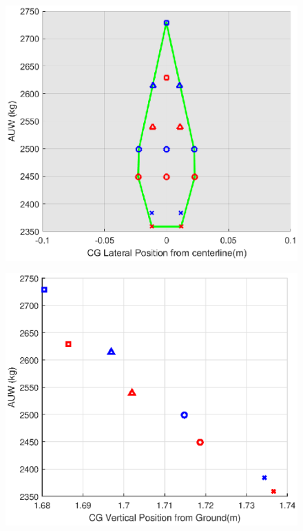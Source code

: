 \documentclass[11pt,a4paper]{article}
\begin{document}
\begin{appendices}
\begin{figure}[H]
\centering
\begin{minipage}{.5\textwidth}
  \centering
  \includegraphics[width=\linewidth]{CGLAT.eps}
  \label{fig:CGlat}
\end{minipage}%
\begin{minipage}{.5\textwidth}
  \centering
  \includegraphics[width=\linewidth]{CGVERT.eps}
  \label{fig:CGvert}
\end{minipage}
\end{figure}




\end{appendices}
\end{document}
